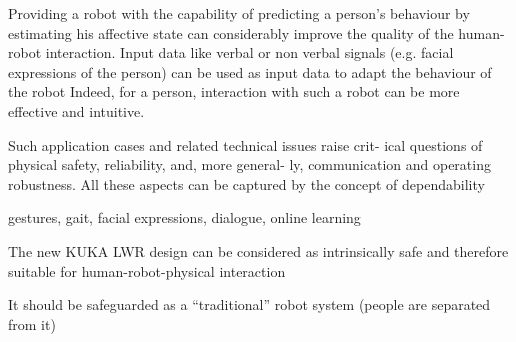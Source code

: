 Providing a robot with the capability of predicting a person's behaviour by estimating his affective state can considerably improve the quality of the human-robot interaction. Input data like verbal or non verbal signals (e.g. facial expressions of the person) can be used as input data to adapt the behaviour of the robot Indeed, for a person, interaction with such a robot can be more effective and intuitive. 



Such application cases and related technical issues raise crit-
ical questions of physical safety, reliability, and, more general-
ly, communication and operating robustness. All these aspects
can be captured by the concept of dependability


gestures, gait, facial expressions, dialogue, online learning

The new KUKA LWR design can be considered as intrinsically safe and therefore suitable for human-robot-physical interaction

It should be safeguarded as a “traditional”
robot system (people are separated from it)
\\
\\
